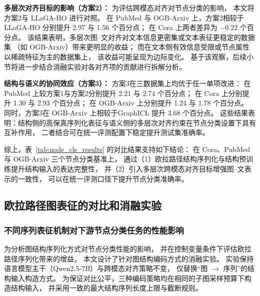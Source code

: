 \textbf{多层次对齐目标的影响（方案2）：}
为评估跨模态对齐对节点分类的影响，
本文将方案2与 LLaGA-HO\cite{Chen2024LLaGALL} 进行对照。
在 PubMed 与 OGB-Arxiv 上，方案2相较于 LLaGA-HO 分别提升 2.97 与 1.56 个百分点；
在 Cora 上两者差异为 $-0.22$ 个百分点。
该结果表明，多层次图--文对齐对文本信息更密集或文本表征更稳定的数据集
（如 OGB-Arxiv）带来更明显的收益；
而在文本侧有效信息受限或节点属性以稀疏特征为主的数据集上，
该收益可能呈现为边际变化。
基于该观察，后续小节将进一步结合消融实验对各对齐项的贡献进行拆解分析。

\textbf{结构与语义的协同效应（方案3）：}
方案3在三数据集上均优于任一单项改进：
在 PubMed 上较方案1与方案2分别提升 2.21 与 2.74 个百分点；
在 Cora 上分别提升 1.30 与 2.93 个百分点；
在 OGB-Arxiv 上分别提升 1.24 与 1.78 个百分点。
同时，方案3在 OGB-Arxiv 上相较于GraphICL\cite{Sun2025GraphICLUG}
提升 3.68 个百分点。
这些结果表明：结构侧的高保真序列化表征与语义侧的多层次对齐约束在节点分类设置下具有互补作用，
二者结合可在统一评测配置下稳定提升测试集准确率。

综上，表~\ref{tab:node_cls_results} 的对比结果支持如下结论：
在 Cora、PubMed 与 OGB-Arxiv 三个节点分类基准上，
通过（1）欧拉路径结构序列化与结构预训练提升结构输入的表达完整性，
并（2）引入多层次跨模态对齐目标增强图--文表示的一致性，
可以在统一评测口径下提升节点分类准确率。

\subsection{欧拉路径图表征的对比和消融实验}
\label{subsec:ablation_encoding}

\subsubsection{不同序列表征机制对下游节点分类任务的性能影响}

为分析图结构序列化方式对节点分类性能的影响，
并在控制变量条件下评估欧拉路径序列化带来的增益，
本文设计了针对图结构编码方式的消融实验。
实验保持语言模型主干（Qwen2.5-7B\cite{Yang2024Qwen25TR}）与跨模态对齐策略不变，
仅替换“图 $\rightarrow$ 序列”的结构输入构造方式。
为保证对比公平，三种编码策略均在相同的子图采样预算下构造结构输入，
并采用一致的最大结构序列长度上限与截断规则。

